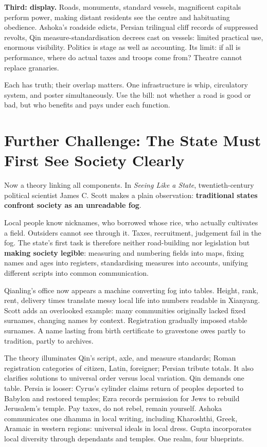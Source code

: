 \textbf{Third: display.} Roads, monuments, standard vessels, magnificent capitals perform power, making distant residents see the centre and habituating obedience. Ashoka's roadside edicts, Persian trilingual cliff records of suppressed revolts, Qin measure-standardisation decrees cast on vessels: limited practical use, enormous visibility. Politics is stage as well as accounting. Its limit: if all is performance, where do actual taxes and troops come from? Theatre cannot replace granaries.

Each has truth; their overlap matters. One infrastructure is whip, circulatory system, and poster simultaneously. Use the bill: not whether a road is good or bad, but who benefits and pays under each function.

\section[Further Challenge: Making Society Legible]{Further Challenge: The State Must First See Society Clearly}
Now a theory linking all components. In \textit{Seeing Like a State}, twentieth-century political scientist James C. Scott makes a plain observation: \textbf{traditional states confront society as an unreadable fog}.

Local people know nicknames, who borrowed whose rice, who actually cultivates a field. Outsiders cannot see through it. Taxes, recruitment, judgement fail in the fog. The state's first task is therefore neither road-building nor legislation but \textbf{making society legible}: measuring and numbering fields into maps, fixing names and ages into registers, standardising measures into accounts, unifying different scripts into common communication.

Qianling's office now appears a machine converting fog into tables. Height, rank, rent, delivery times translate messy local life into numbers readable in Xianyang. Scott adds an overlooked example: many communities originally lacked fixed surnames, changing names by context. Registration gradually imposed stable surnames. A name lasting from birth certificate to gravestone owes partly to tradition, partly to archives.

The theory illuminates Qin's script, axle, and measure standards; Roman registration categories of citizen, Latin, foreigner; Persian tribute totals. It also clarifies solutions to universal order versus local variation. Qin demands one table. Persia is looser: Cyrus's cylinder claims return of peoples deported to Babylon and restored temples; Ezra records permission for Jews to rebuild Jerusalem's temple. Pay taxes, do not rebel, remain yourself. Ashoka communicates one dhamma in local writing, including Kharoshthi, Greek, Aramaic in western regions: universal ideals in local dress. Gupta incorporates local diversity through dependants and temples. One realm, four blueprints.

